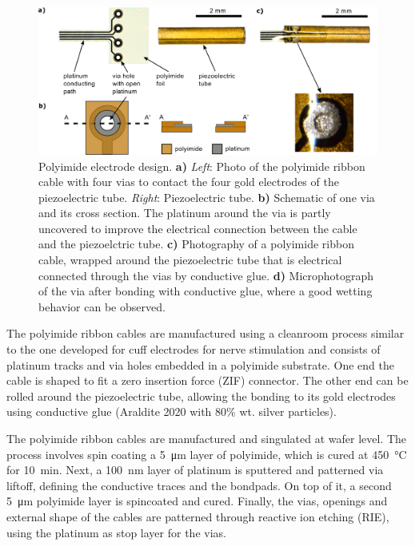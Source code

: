 \documentclass[10pt]{iopart}
\begin{document}
\begin{figure}[h!]\centering \includegraphics[width=\columnwidth]{figures/tubeFoilH.png}
      \caption{Polyimide electrode design.
      \textbf{a)} \textit{Left}: Photo of the polyimide ribbon cable with four vias to contact the four gold electrodes of the piezoelectric tube. \textit{Right}: Piezoelectric tube.
      \textbf{b)} Schematic of one via and its cross section. The platinum around the via is partly uncovered to improve the electrical connection between the cable and the piezoelctric tube.
      \textbf{c)} Photography of a polyimide ribbon cable, wrapped around the piezoelectric tube that is electrical connected through the vias by conductive glue.
      \textbf{d)} Microphotograph of the via after bonding with conductive glue, where a good wetting behavior can be observed.}
      \label{fig:piRolled}
\end{figure}

The polyimide ribbon cables are manufactured using a cleanroom process similar to the one developed for cuff electrodes for nerve stimulation \cite{Rodriguez2000} and consists of platinum tracks and via holes embedded in a polyimide substrate. One end the cable is shaped to fit a zero insertion force (ZIF) connector. The other end can be rolled around the piezoelectric tube, allowing the bonding to its gold electrodes using conductive glue (Araldite 2020 with 80\% wt. silver particles).

The polyimide ribbon cables are manufactured and singulated at wafer level. The process involves spin coating a \SI{5}{\micro\meter} layer of polyimide, which is cured at \SI{450}{\celsius} for \SI{10}{\minute}. Next, a \SI{100}{\nano\meter} layer of platinum is sputtered and patterned via liftoff, defining the conductive traces and the bondpads. On top of it, a second \SI{5}{\micro\meter} polyimide layer is spincoated and cured. Finally, the vias, openings and external shape of the cables are patterned through reactive ion etching (RIE), using the platinum as stop layer for the vias.
\end{document}
